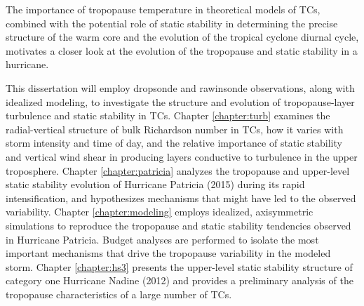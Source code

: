 The importance of tropopause temperature in theoretical models of TCs, combined with the potential role of static stability in determining the precise structure of the warm core and the evolution of the tropical cyclone diurnal cycle, motivates a closer look at the evolution of the tropopause and static stability in a hurricane.

This dissertation will employ dropsonde and rawinsonde observations, along with idealized modeling, to investigate the structure and evolution of tropopause-layer turbulence and static stability in TCs.
Chapter \ref{chapter:turb} examines the radial-vertical structure of bulk Richardson number in TCs, how it varies with storm intensity and time of day, and the relative importance of static stability and vertical wind shear in producing layers conductive to turbulence in the upper troposphere.
Chapter \ref{chapter:patricia} analyzes the tropopause and upper-level static stability evolution of Hurricane Patricia (2015) during its rapid intensification, and hypothesizes mechanisms that might have led to the observed variability.
Chapter \ref{chapter:modeling} employs idealized, axisymmetric simulations to reproduce the tropopause and static stability tendencies observed in Hurricane Patricia.
Budget analyses are performed to isolate the most important mechanisms that drive the tropopause variability in the modeled storm.
Chapter \ref{chapter:hs3} presents the upper-level static stability structure of category one Hurricane Nadine (2012) and provides a preliminary analysis of the tropopause characteristics of a large number of TCs.


\clearpage



